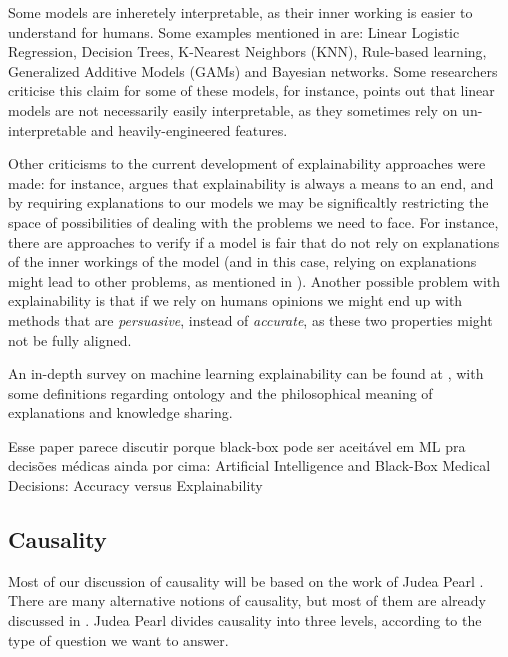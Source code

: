 Some models are inheretely interpretable, as their inner working is easier to understand for humans. Some examples mentioned in \cite{belle2021principles} are: Linear Logistic Regression, Decision Trees, K-Nearest Neighbors (KNN), Rule-based learning, Generalized Additive Models (GAMs) and Bayesian networks. Some researchers criticise this claim for some of these models, for instance, \cite{lipton2018mythos} points out that linear models are not necessarily easily interpretable, as they sometimes rely on un-interpretable and heavily-engineered features.

Other criticisms to the current development of explainability approaches were made: for instance, \cite{krishnan2020against} argues that explainability is always a means to an end, and by requiring explanations to our models we may be significaltly restricting the space of possibilities of dealing with the problems we need to face. For instance, there are approaches to verify if a model is fair that do not rely on explanations of the inner workings of the model (and in this case, relying on explanations might lead to other problems, as mentioned in \cite{ExplainAll}). Another possible problem with explainability is that if we rely on humans opinions we might end up with methods that are \emph{persuasive}, instead of \emph{accurate}, as these two properties might not be fully aligned. 

An in-depth survey on machine learning explainability can be found at \cite{burkart2021survey}, with some definitions regarding ontology and the philosophical meaning of explanations and knowledge sharing. 

{\color{red} Esse paper parece discutir porque black-box pode ser aceitável em ML pra decisões médicas ainda por cima: Artificial Intelligence and Black-Box Medical Decisions: Accuracy versus Explainability}

\subsection{Causality}

Most of our discussion of causality will be based on the work of Judea Pearl \cite{Causality}. There are many alternative notions of causality, but most of them are already discussed in \cite{Causality}. Judea Pearl divides causality into three levels, according to the type of question we want to answer. 

